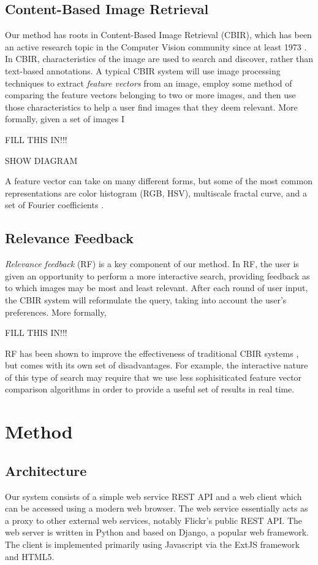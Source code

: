 \documentclass{article}
\begin{document}
\subsection{Content-Based Image Retrieval}
Our method has roots in Content-Based Image Retrieval (CBIR), which has been an active research topic in the Computer Vision
community since at least 1973 \cite{mars}.  In CBIR, characteristics of the image are used to search and discover, rather
than text-based annotations.  A typical CBIR system will use image processing techniques to extract {\em feature vectors}
from an image, employ some method of comparing the feature vectors belonging to two or more images, and then use those
characteristics to help a user find images that they deem relevant.  More formally, given a set of images I

FILL THIS IN!!!

SHOW DIAGRAM

A feature vector can take on many different forms, but some of the most common representations are color histogram (RGB, HSV),
multiscale fractal curve, and a set of Fourier coefficients \cite{survey}.

\subsection{Relevance Feedback}
{\em Relevance feedback} (RF) is a key component of our method.  In RF, the user is given an opportunity to perform a more
interactive search, providing feedback as to which images may be most and least relevant.  After each round of user input,
the CBIR system will reformulate the query, taking into account the user's preferences.  More formally,

FILL THIS IN!!!

RF has been shown to improve the
effectiveness of traditional CBIR systems \cite{survey}, but comes with its own set of disadvantages.  For example, the
interactive nature of this type of search may require that we use less sophisiticated feature vector comparison algorithms
in order to provide a useful set of results in real time.


\section{Method}

\subsection{Architecture}
Our system consists of a simple web service REST API and a web client which can be accessed using a modern web browser.
The web service essentially acts as a proxy to other external web services, notably Flickr's public REST API.  The web
server is written in Python and based on Django, a popular web framework.  The client is implemented primarily using
Javascript via the ExtJS framework and HTML5.
\end{document}

